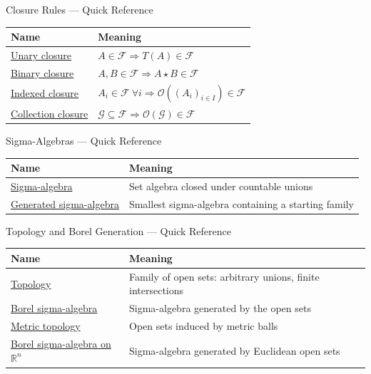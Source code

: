 

\begin{toolkitbox}{Closure Rules --- Quick Reference}
\small
\begin{tabular}{l l}
\toprule
\textbf{Name}  & \textbf{Meaning} \\
\midrule
\hyperref[def:closed-under-set-operation-vocabulary]{Unary closure} & \(A\in\mathcal F\Rightarrow T(A)\in\mathcal F\) \\
\hyperref[def:closed-under-set-operation-vocabulary]{Binary closure} & \(A,B\in\mathcal F\Rightarrow A\star B\in\mathcal F\) \\
\hyperref[def:closed-under-set-operation-vocabulary]{Indexed closure} & \(A_i\in\mathcal F\ \forall i\Rightarrow \mathcal O((A_i)_{i\in I})\in\mathcal F\) \\
\hyperref[def:closed-under-set-operation-vocabulary]{Collection closure} & \(\mathcal G\subseteq\mathcal F\Rightarrow \mathcal O(\mathcal G)\in\mathcal F\) \\
\bottomrule
\end{tabular}
\end{toolkitbox}




\begin{toolkitbox}{Sigma-Algebras --- Quick Reference}
\small
\begin{tabular}{l l}
\toprule
\textbf{Name}  & \textbf{Meaning} \\
\midrule
\hyperref[def:sigma-algebra]{Sigma-algebra} & Set algebra closed under countable unions \\
\hyperref[def:generated-sigma-algebra]{Generated sigma-algebra} & Smallest sigma-algebra containing a starting family \\
\bottomrule
\end{tabular}
\end{toolkitbox}



\begin{toolkitbox}{Topology and Borel Generation --- Quick Reference}
\small
\begin{tabular}{l l}
\toprule
\textbf{Name}  & \textbf{Meaning} \\
\midrule
\hyperref[def:topology]{Topology} & Family of open sets: arbitrary unions, finite intersections \\
\hyperref[def:borel-sigma-algebra]{Borel sigma-algebra} & Sigma-algebra generated by the open sets \\
\hyperref[def:metric-topology]{Metric topology} & Open sets induced by metric balls \\
\hyperref[def:borel-sigma-algebra-rn]{Borel sigma-algebra on $\mathbb R^n$} & Sigma-algebra generated by Euclidean open sets \\
\bottomrule
\end{tabular}
\end{toolkitbox}


